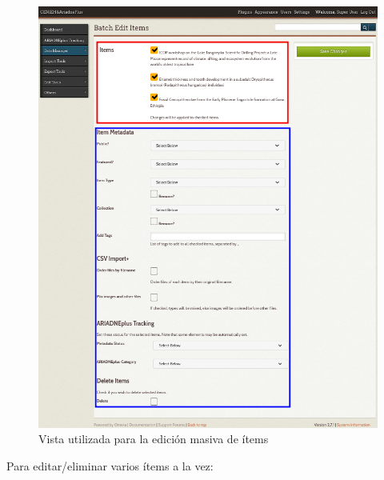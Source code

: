 \documentclass[
]{article}
\begin{document}
\begin{figure}
\hypertarget{batch-edit-view}{%
\centering
\includegraphics{../_static/images/batch-edit-view.png}
\caption{Vista utilizada para la edición masiva de
ítems}\label{batch-edit-view}
}
\end{figure}

Para editar/eliminar varios ítems a la vez:
\end{document}
